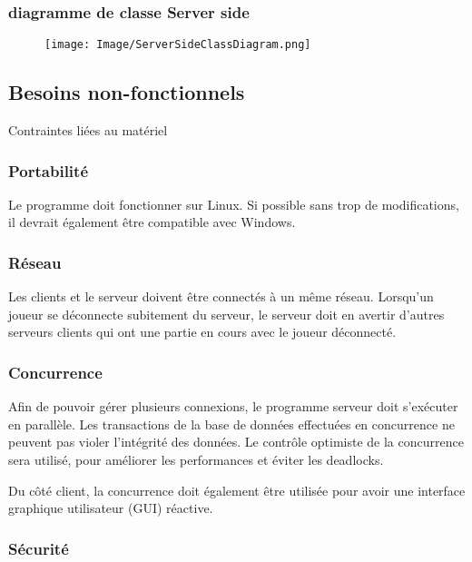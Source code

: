 \documentclass[french, utf8]{article}
\begin{document}
\subsubsection{diagramme de classe Server side}
\begin{figure}[ht]
\centering
    \texttt{[image: Image/ServerSideClassDiagram.png]}
\end{figure}



\subsection{Besoins non-fonctionnels}
Contraintes liées au matériel

\subsubsection{Portabilité}

Le programme doit fonctionner sur Linux. Si possible sans trop de modifications, il devrait également être compatible avec Windows.

\subsubsection{Réseau}

Les clients et le serveur doivent être connectés à un même réseau. Lorsqu'un joueur se déconnecte subitement du serveur, le serveur doit en avertir d'autres serveurs clients qui ont une partie en cours avec le joueur déconnecté.

\subsubsection{Concurrence}

Afin de pouvoir gérer plusieurs connexions, le programme serveur doit s'exécuter en parallèle. Les transactions de la base de données effectuées en concurrence ne peuvent pas violer l'intégrité des données. Le contrôle optimiste de la concurrence sera utilisé, pour améliorer les performances et éviter les deadlocks.

Du côté client, la concurrence doit également être utilisée pour avoir une interface graphique utilisateur (GUI) réactive.

\subsubsection{Sécurité}
\end{document}
